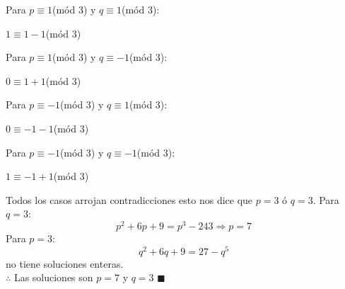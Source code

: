 \documentclass{book}
\begin{document}
\begin{enumerate}
          Para $p\equiv 1$(mód 3)  y $q\equiv 1 $(mód 3):
          \begin{center}
              $1\equiv 1-1$(mód 3)
          \end{center}
          Para $p\equiv 1 $(mód 3)  y $q\equiv -1 $(mód 3):
          \begin{center}
              $0\equiv 1+1$(mód 3)
          \end{center}
          Para $p\equiv -1 $(mód 3)  y $q\equiv 1 $(mód 3):
          \begin{center}
              $0\equiv -1-1$(mód 3)
          \end{center}
          Para $p\equiv -1 $(mód 3)  y $q\equiv -1 $(mód 3):
          \begin{center}
              $1\equiv -1+1$(mód 3)
          \end{center}
          Todos los casos arrojan contradicciones esto nos dice que $p=3$ ó  $q=3$.
          Para $q=3$:
          $$p^2+6p+9=p^3-243 \Rightarrow p=7$$
          Para $p=3$:
          $$q^2+6q+9=27-q^5 $$  no tiene soluciones enteras.\\
          $\therefore$ Las soluciones son $p=7$ y $q=3$ $\blacksquare$\\
          

\end{enumerate}
\end{document}
